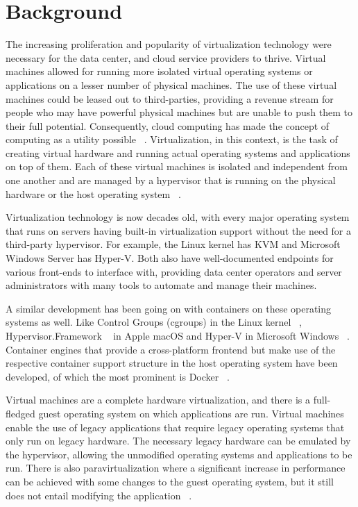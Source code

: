 \documentclass[10pt,twocolumn]{article}
\begin{document}
\section{Background}

The increasing proliferation and popularity of virtualization technology were necessary for the data center, and cloud service providers to thrive.
Virtual machines allowed for running more isolated virtual operating systems or applications on a lesser number of physical machines.
The use of these virtual machines could be leased out to third-parties, providing a revenue stream for people who may have powerful physical machines but are unable to push them to their full potential.
Consequently, cloud computing has made the concept of computing as a utility possible ~\cite{berkeley_cloud}.
Virtualization, in this context, is the task of creating virtual hardware and running actual operating systems and applications on top of them.
Each of these virtual machines is isolated and independent from one another and are managed by a hypervisor that is running on the physical hardware or the host operating system ~\cite{xen}.

Virtualization technology is now decades old, with every major operating system that runs on servers having built-in virtualization support without the need for a third-party hypervisor.
For example, the Linux kernel has KVM and Microsoft Windows Server has Hyper-V.
Both also have well-documented endpoints for various front-ends to interface with, providing data center operators and server administrators with many tools to automate and manage their machines.

A similar development has been going on with containers on these operating systems as well. Like Control Groups (cgroups) in the Linux kernel ~\cite{cgroups}, Hypervisor.Framework ~\cite{hypervisor_framework} in Apple macOS and Hyper-V in Microsoft Windows ~\cite{hyperv_containers}.
Container engines that provide a cross-platform frontend but make use of the respective container support structure in the host operating system have been developed, of which the most prominent is Docker ~\cite{intro_docker}.

Virtual machines are a complete hardware virtualization, and there is a full-fledged guest operating system on which applications are run. Virtual machines enable the use of legacy applications that require legacy operating systems that only run on legacy hardware.
The necessary legacy hardware can be emulated by the hypervisor, allowing the unmodified operating systems and applications to be run.
There is also paravirtualization where a significant increase in performance can be achieved with some changes to the guest operating system, but it still does not entail modifying the application ~\cite{xen}.
\end{document}
